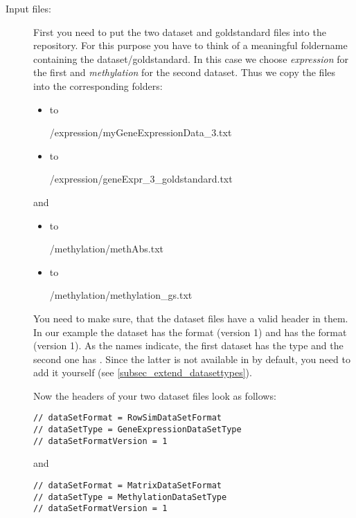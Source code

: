\begin{description}
	\item[Input files:] First you need to put the two dataset and goldstandard files into the repository. For this purpose you have to think of a meaningful foldername containing the dataset/goldstandard. In this case we choose \textit{expression} for the first and \textit{methylation} for the second dataset. Thus we copy the files into the corresponding folders:
	\begin{itemize}
		\item {} to
		
		 \repodatasets/expression/myGeneExpressionData\_3.txt
		 \item {} to
		
		 \repogoldstandards/expression/geneExpr\_3\_goldstandard.txt
	\end{itemize}
	and
	\begin{itemize}
		\item {} to
		
		 \repodatasets/methylation/methAbs.txt
		 \item {} to
		
		 \repogoldstandards/methylation/methylation\_gs.txt
	\end{itemize}
	
	You need to make sure, that the dataset files have a valid header in them. In our example the dataset  has the format  (version 1) and  has the format  (version 1). As the names indicate, the first dataset has the type  and the second one has . Since the latter is not available in \clusteval by default, you need to add it yourself (see \ref{subsec_extend_datasettypes}).
	
	Now the headers of your two dataset files look as follows:
	
	\begin{lstlisting}
// dataSetFormat = RowSimDataSetFormat
// dataSetType = GeneExpressionDataSetType
// dataSetFormatVersion = 1
	\end{lstlisting}
	
and

	\begin{lstlisting}
// dataSetFormat = MatrixDataSetFormat
// dataSetType = MethylationDataSetType
// dataSetFormatVersion = 1
	\end{lstlisting}
	

\end{description}
